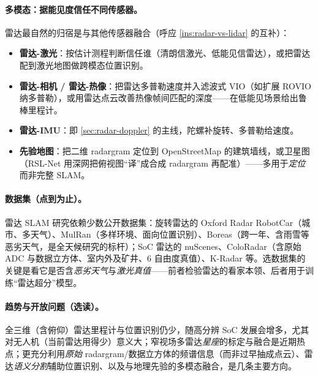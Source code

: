 \paragraph{多模态：据能见度信任不同传感器。}
\label{sec:radar-multimodal}
雷达最自然的归宿是与其他传感器融合（呼应 \cref{ins:radar-vs-lidar} 的互补）\cite{carlone2026handbook}：
\begin{itemize}
  \item \textbf{雷达-激光}：按估计测程判断信任谁（清朗信激光、低能见信雷达），或把雷达配到激光地图做跨模态位置识别。
  \item \textbf{雷达-相机 / 雷达-热像}：把雷达多普勒速度并入滤波式 VIO（如扩展 ROVIO 纳多普勒），或用雷达点云改善热像帧间匹配的深度——在低能见场景给出鲁棒里程计。
  \item \textbf{雷达-IMU}：即 \cref{sec:radar-doppler} 的主线，陀螺补旋转、多普勒给速度。
  \item \textbf{先验地图}：把二维 radargram 定位到 OpenStreetMap 的建筑墙线，或卫星图（RSL-Net 用深网把俯视图“译”成合成 radargram 再配准）——多用于\emph{定位}而非完整 SLAM。
\end{itemize}

\paragraph{数据集（点到为止）。}
雷达 SLAM 研究依赖少数公开数据集\cite{carlone2026handbook}：旋转雷达的 Oxford Radar RobotCar（城市、多天气）、MulRan（多样环境、面向位置识别）、Boreas（跨一年、含雨雪等恶劣天气，是全天候研究的标杆）；SoC 雷达的 nuScenes、ColoRadar（含原始 ADC 与数据立方体、室内外及矿井、$6$ 自由度真值）、K-Radar 等。选数据集的关键是看它是否含\emph{恶劣天气}与\emph{激光真值}——前者检验雷达的看家本领、后者用于训练“雷达超分”模型。

\paragraph{趋势与开放问题（选读）。}
全三维（含俯仰）雷达里程计与位置识别仍少，随高分辨 SoC 发展会增多，尤其对无人机（当前雷达用得少）意义大；窄视场多雷达\emph{星座}的标定与融合是近期热点；更充分利用\emph{原始} radargram/数据立方体的频谱信息（而非过早抽成点云）、雷达\emph{语义分割}辅助位置识别、以及与地理先验的多模态融合，是几条主要方向。

